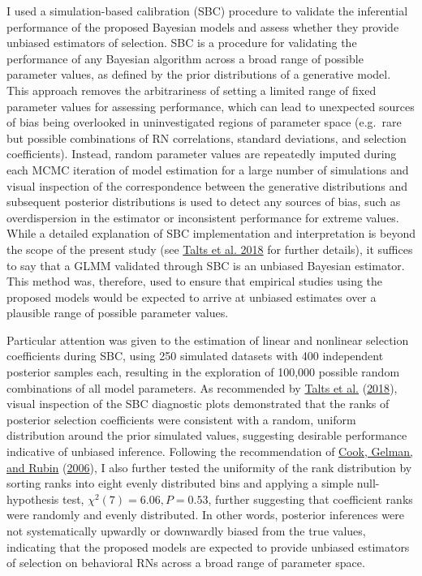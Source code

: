 \documentclass{article}
\begin{document}
I used a simulation-based calibration (SBC) procedure to validate the
inferential performance of the proposed Bayesian models and assess
whether they provide unbiased estimators of selection. SBC is a
procedure for validating the performance of any Bayesian algorithm
across a broad range of possible parameter values, as defined by the
prior distributions of a generative model. This approach removes the
arbitrariness of setting a limited range of fixed parameter values for
assessing performance, which can lead to unexpected sources of bias
being overlooked in uninvestigated regions of parameter space (e.g.~rare
but possible combinations of RN correlations, standard deviations, and
selection coefficients). Instead, random parameter values are repeatedly
imputed during each MCMC iteration of model estimation for a large
number of simulations and visual inspection of the correspondence
between the generative distributions and subsequent posterior
distributions is used to detect any sources of bias, such as
overdispersion in the estimator or inconsistent performance for extreme
values. While a detailed explanation of SBC implementation and
interpretation is beyond the scope of the present study (see
\protect\hyperlink{ref-Talts2018}{Talts et al. 2018} for further
details), it suffices to say that a GLMM validated through SBC is an
unbiased Bayesian estimator. This method was, therefore, used to ensure
that empirical studies using the proposed models would be expected to
arrive at unbiased estimates over a plausible range of possible
parameter values.

Particular attention was given to the estimation of linear and nonlinear
selection coefficients during SBC, using 250 simulated datasets with 400
independent posterior samples each, resulting in the exploration of
100,000 possible random combinations of all model parameters. As
recommended by \protect\hyperlink{ref-Talts2018}{Talts et al.}
(\protect\hyperlink{ref-Talts2018}{2018}), visual inspection of the SBC
diagnostic plots demonstrated that the ranks of posterior selection
coefficients were consistent with a random, uniform distribution around
the prior simulated values, suggesting desirable performance indicative
of unbiased inference. Following the recommendation of
\protect\hyperlink{ref-Cook2006}{Cook, Gelman, and Rubin}
(\protect\hyperlink{ref-Cook2006}{2006}), I also further tested the
uniformity of the rank distribution by sorting ranks into eight evenly
distributed bins and applying a simple null-hypothesis test,
\(\chi^2(7)=6.06, P = 0.53\), further suggesting that coefficient ranks
were randomly and evenly distributed. In other words, posterior
inferences were not systematically upwardly or downwardly biased from
the true values, indicating that the proposed models are expected to
provide unbiased estimators of selection on behavioral RNs across a
broad range of parameter space.
\end{document}
